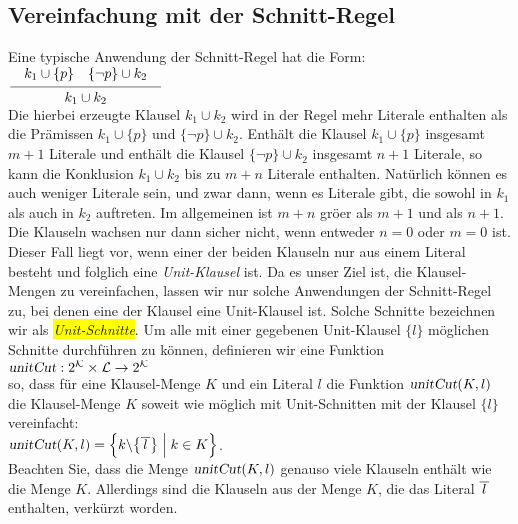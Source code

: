 \subsection{Vereinfachung mit der Schnitt-Regel}
Eine typische Anwendung der Schnitt-Regel hat die Form: \\[0.2cm]
\hspace*{1.3cm} $\schluss{ k_1 \cup \{p\} \quad \{\neg p\} \cup k_2}{k_1 \cup k_2}$
\\[0.2cm]
Die hierbei erzeugte Klausel $k_1 \cup k_2$ wird in der Regel mehr Literale enthalten
als die Pr\"{a}missen $k_1 \cup \{p\}$ und $\bigl\{\neg p\} \cup k_2$.  Enth\"{a}lt die
Klausel $k_1 \cup \{p\}$ insgesamt $m+1$ Literale und enth\"{a}lt die Klausel
$\bigl\{\neg p\} \cup k_2$ insgesamt $n+1$ Literale, so kann die Konklusion $k_1 \cup k_2$ 
bis zu $m + n$ Literale enthalten.  Nat\"{u}rlich k\"{o}nnen es auch weniger Literale 
sein, und zwar dann, wenn es Literale gibt, die sowohl in $k_1$ als auch in $k_2$
auftreten.  Im allgemeinen ist $m + n$ gr\"{o}\3er als $m + 1$ und als $n + 1$.  Die
Klauseln wachsen nur dann sicher nicht, wenn entweder $n = 0$ oder $m = 0$ ist.
Dieser Fall liegt vor, wenn einer der beiden Klauseln nur aus einem Literal besteht
und folglich eine \emph{Unit-Klausel} ist.  Da es unser Ziel ist, die Klausel-Mengen
zu vereinfachen, lassen wir nur solche Anwendungen der Schnitt-Regel zu, bei denen
eine der Klausel eine Unit-Klausel ist.  Solche Schnitte bezeichnen wir als
\colorbox{yellow}{\emph{Unit-Schnitte}}.  Um alle mit einer gegebenen Unit-Klausel $\{l\}$ m\"{o}glichen Schnitte
durchf\"{u}hren zu k\"{o}nnen, definieren wir eine Funktion
\\[0.2cm]
\hspace*{1.3cm}
$\textsl{unitCut}: 2^\mathcal{K} \times \mathcal{L} \rightarrow 2^\mathcal{K}$
\\[0.2cm]
so, dass f\"{u}r eine Klausel-Menge $K$ und ein Literal $l$ die Funktion
$\textsl{unitCut}(K,l)$ die Klausel-Menge $K$ soweit wie m\"{o}glich mit Unit-Schnitten mit der Klausel
$\{l\}$ vereinfacht:
\\[0.2cm]
\hspace*{1.3cm}
$\textsl{unitCut}(K,l) = \Bigl\{ k \backslash \bigl\{ \overline{\,l\,} \bigr\} \;\Big|\; k \in K \Bigr\}$.
\\[0.2cm]
Beachten Sie, dass die Menge $\textsl{unitCut}(K,l)$ genauso viele Klauseln enth\"{a}lt wie die Menge
$K$.  Allerdings sind die Klauseln aus der Menge $K$, die das Literal $\overline{\,l\,}$
enthalten, verk\"{u}rzt worden. 

